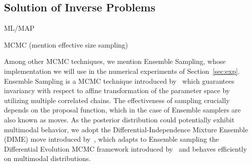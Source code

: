 \subsection{Solution of Inverse Problems}\label{sec:IP-sol}
ML/MAP\medskip

MCMC (mention effective size sampling)\medskip

Among other MCMC techniques, we mention Ensemble Sampling, whose implementation we will use in the numerical experiments of Section~\ref{sec:exp}.
Ensemble Sampling is a MCMC technique introduced by~\cite{GoodmanWeare} which guarantees invariancy with respect to affine transformation of the parameter space by utilizing multiple correlated chains. 
The effectiveness of sampling crucially depends on the proposal function, which in the case of Ensemble samplers are also known as moves.
As the posterior distribution could potentially exhibit multimodal behavior, we adopt the Differential-Independence Mixture Ensemble (DIME) move introduced by~\cite{Boehl}, which adapts to Ensemble sampling the Differential Evolution MCMC framework introduced by~\cite{TerBraak} and behaves efficiently on multimodal distributions. 